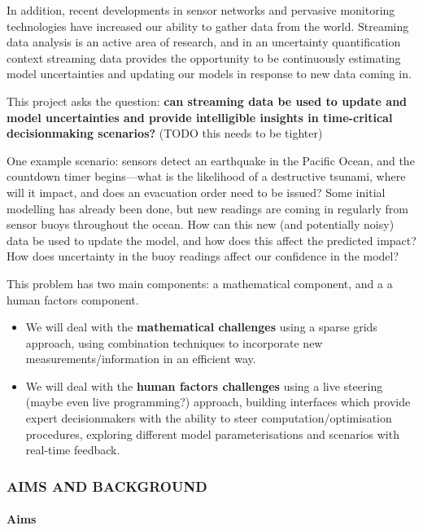 \documentclass[a4paper,fontsize=12pt]{scrartcl}
\begin{document}
In addition, recent developments in sensor networks and pervasive
monitoring technologies have increased our ability to gather data from
the world. Streaming data analysis is an active area of research, and
in an uncertainty quantification context streaming data provides the
opportunity to be continuously estimating model uncertainties and
updating our models in response to new data coming in.

This project asks the question: \textbf{can streaming data be used to
  update and model uncertainties and provide intelligible insights in
  time-critical decisionmaking scenarios?} (TODO this needs to be
tighter)

One example scenario: sensors detect an earthquake in the Pacific Ocean,
and the countdown timer begins---what is the likelihood of a
destructive tsunami, where will it impact, and does an evacuation
order need to be issued? Some initial modelling has already been done,
but new readings are coming in regularly from sensor buoys throughout
the ocean. How can this new (and potentially noisy) data be used to
update the model, and how does this affect the predicted impact? How
does uncertainty in the buoy readings affect our confidence in the
model?

This problem has two main components: a mathematical component, and a
a human factors component.
\begin{itemize}
\item We will deal with the \textbf{mathematical challenges} using a
  sparse grids approach, using combination techniques
  to incorporate new measurements/information in an efficient way.
\item We will deal with the \textbf{human factors challenges} using a
  live steering (maybe even live programming?) approach, building
  interfaces which provide expert decisionmakers with the ability to
  steer computation/optimisation procedures, exploring different model
  parameterisations and scenarios with real-time feedback.
\end{itemize}

\subsubsection*{AIMS AND BACKGROUND}

\paragraph*{Aims}\mbox{}\\
\end{document}
